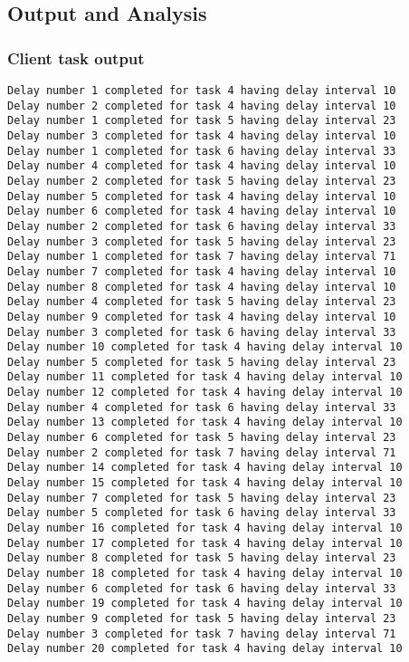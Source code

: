 \documentclass{article}
\begin{document}
\subsection{Output and Analysis}
\subsubsection{Client task output}
\begin{verbatim}
Delay number 1 completed for task 4 having delay interval 10
Delay number 2 completed for task 4 having delay interval 10
Delay number 1 completed for task 5 having delay interval 23
Delay number 3 completed for task 4 having delay interval 10
Delay number 1 completed for task 6 having delay interval 33
Delay number 4 completed for task 4 having delay interval 10
Delay number 2 completed for task 5 having delay interval 23
Delay number 5 completed for task 4 having delay interval 10
Delay number 6 completed for task 4 having delay interval 10
Delay number 2 completed for task 6 having delay interval 33
Delay number 3 completed for task 5 having delay interval 23
Delay number 1 completed for task 7 having delay interval 71
Delay number 7 completed for task 4 having delay interval 10
Delay number 8 completed for task 4 having delay interval 10
Delay number 4 completed for task 5 having delay interval 23
Delay number 9 completed for task 4 having delay interval 10
Delay number 3 completed for task 6 having delay interval 33
Delay number 10 completed for task 4 having delay interval 10
Delay number 5 completed for task 5 having delay interval 23
Delay number 11 completed for task 4 having delay interval 10
Delay number 12 completed for task 4 having delay interval 10
Delay number 4 completed for task 6 having delay interval 33
Delay number 13 completed for task 4 having delay interval 10
Delay number 6 completed for task 5 having delay interval 23
Delay number 2 completed for task 7 having delay interval 71
Delay number 14 completed for task 4 having delay interval 10
Delay number 15 completed for task 4 having delay interval 10
Delay number 7 completed for task 5 having delay interval 23
Delay number 5 completed for task 6 having delay interval 33
Delay number 16 completed for task 4 having delay interval 10
Delay number 17 completed for task 4 having delay interval 10
Delay number 8 completed for task 5 having delay interval 23
Delay number 18 completed for task 4 having delay interval 10
Delay number 6 completed for task 6 having delay interval 33
Delay number 19 completed for task 4 having delay interval 10
Delay number 9 completed for task 5 having delay interval 23
Delay number 3 completed for task 7 having delay interval 71
Delay number 20 completed for task 4 having delay interval 10
\end{verbatim}
\end{document}
